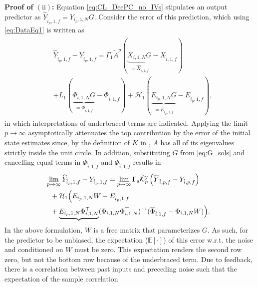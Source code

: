 \noindent\textbf{Proof of $(\mathrm{ii})$:} Equation \eqref{eq:CL_DeePC_no_IVs} stipulates an output predictor as $\widehat{Y}_{\hat{i}_p,1,f}=Y_{i_p,1,N}G$. Consider the error of this prediction, which using \eqref{eq:DataEq1} is written as
\begin{align}\label{eq:Yf_error1}
    \begin{split}
        &\!\!\!\widehat{Y}_{\hat{i}_p,1,f}-Y_{\hat{i}_p,1,f} = \Gamma_1 \tilde{A}^p (\underbrace{X_{i,1,N}G}_{=\widehat{X}_{\hat{i},1,f}}-X_{\hat{i},1,f}) \\
        &+L_1(\underbrace{\Phi_{i,1,N}G}_{=\overline{\Phi}_{\hat{i},1,f}}-\Phi_{\hat{i},1,f}) +\mathcal{H}_1 (\underbrace{E_{i_p,1,N}G}_{=\widehat{E}_{\hat{i}_p,1,f}}-E_{\hat{i}_p,1,f}),
    \end{split}
\end{align}
in which interpretations of underbraced terms are indicated. Applying the limit $p\rightarrow\infty$ asymptotically attenuates the top contribution by the error of the initial state estimates since, by the definition of $K$ in , $\tilde{A}$ has all of its eigenvalues strictly inside the unit circle. In addition, substituting $G$ from \eqref{eq:G_sols} and cancelling equal terms in $\overline{\Phi}_{\hat{i},1,f}$ and $\Phi_{\hat{i},1,f}$ results in
\begin{alignat}{2}
        &\!\!\!\!\lim_{p\rightarrow\infty} \widehat{Y}_{\hat{i}_p,1,f}-Y_{\hat{i}_p,1,f} = \lim_{p\rightarrow\infty}\Gamma_s\tKp{y}\left(\overline{Y}_{\hat{i},p,f}-Y_{\hat{i},p,f}\right)\notag\\
        &+\mathcal{H}_1\Big(E_{i_p,1,N} W-E_{\hat{i}_p,1,f}\label{eq:Yf_error2}\\
        &+\underbrace{E_{i_p,1,N}\Phi_{i,1,N}^\top}(\Phi_{i,1,N}\Phi_{i,1,N}^\top)\inv(\overline{\Phi}_{\hat{i},1,f}-\Phi_{i,1,N}W)\Big)\notag.
\end{alignat}%
In the above formulation, $W$ is a free matrix that parameterizes $G$. As such, for the predictor to be unbiased, the expectation ($\mathbb{E}[\cdot]$) of this error w.r.t. the noise and conditioned on $W$ must be zero.  This expectation renders the second row zero, but not the bottom row because of the underbraced term. Due to feedback, there is a correlation between past inputs and preceding noise such that the expectation of the sample correlation
